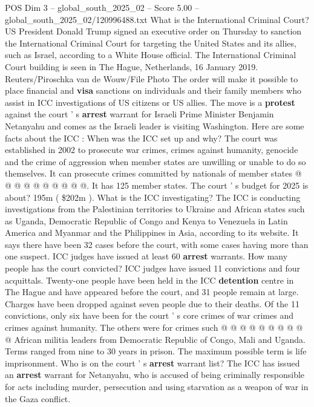 \begin{textsample}{POS Dim 3 – global\_south\_2025\_02 – Score 5.00 – global\_south\_2025\_02/120996488.txt}  \label{ex:f3_pos_447}
What is the International Criminal Court?
US President Donald Trump signed an executive order on Thursday to sanction the International Criminal Court for targeting the United States and its allies, such as Israel, according to a White House official.
The International Criminal Court building is seen in The Hague, Netherlands, 16 January 2019.
Reuters/Piroschka van de Wouw/File Photo The order will make it possible to place financial and \textbf{visa} sanctions on individuals and their family members who assist in ICC investigations of US citizens or US allies.
The move is a \textbf{protest} against the court ' s \textbf{arrest} warrant for Israeli Prime Minister Benjamin Netanyahu and comes as the Israeli leader is visiting Washington.
Here are some facts about the ICC : When was the ICC set up and why?
The court was established in 2002 to prosecute war crimes, crimes against humanity, genocide and the crime of aggression when member states are unwilling or unable to do so themselves.
It can prosecute crimes committed by nationals of member states @ @ @ @ @ @ @ @ @ @.
It has 125 member states.
The court ' s budget for 2025 is about? 195m ( \$202m ).
What is the ICC investigating?
The ICC is conducting investigations from the Palestinian territories to Ukraine and African states such as Uganda, Democratic Republic of Congo and Kenya to Venezuela in Latin America and Myanmar and the Philippines in Asia, according to its website.
It says there have been 32 cases before the court, with some cases having more than one suspect.
ICC judges have issued at least 60 \textbf{arrest} warrants.
How many people has the court convicted?
ICC judges have issued 11 convictions and four acquittals.
Twenty-one people have been held in the ICC \textbf{detention} centre in The Hague and have appeared before the court, and 31 people remain at large.
Charges have been dropped against seven people due to their deaths.
Of the 11 convictions, only six have been for the court ' s core crimes of war crimes and crimes against humanity.
The others were for crimes such @ @ @ @ @ @ @ @ @ @ African militia leaders from Democratic Republic of Congo, Mali and Uganda.
Terms ranged from nine to 30 years in prison.
The maximum possible term is life imprisonment.
Who is on the court ' s \textbf{arrest} warrant list?
The ICC has issued an \textbf{arrest} warrant for Netanyahu, who is accused of being criminally responsible for acts including murder, persecution and using starvation as a weapon of war in the Gaza conflict.

\end{textsample}
